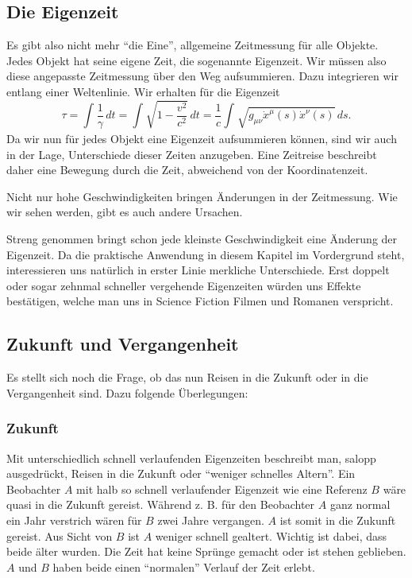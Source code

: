 \begin{refsection}
\subsection{Die Eigenzeit}
Es gibt also nicht mehr ``die Eine'', allgemeine Zeitmessung für alle Objekte. Jedes Objekt hat seine eigene Zeit, die sogenannte Eigenzeit. Wir müssen also diese angepasste Zeitmessung über den Weg aufsummieren.
Dazu integrieren wir entlang einer Weltenlinie. Wir erhalten für die Eigenzeit
\begin{equation}\label{Eigenzeit}
\tau
=
\int_{}^{}\frac{1}{\gamma}\,dt=\int_{}^{}\sqrt{1-\frac{v^2}{c^2}}\,dt
=
\frac{1}{c}\int_{}^{}\sqrt{g_{\mu\nu}\dot{x}^{\mu}(s)\dot{x}^{\nu}(s)}\,ds.
\end{equation}
Da wir nun für jedes Objekt eine Eigenzeit aufsummieren können, sind wir auch in der Lage, Unterschiede dieser Zeiten anzugeben.
Eine Zeitreise beschreibt daher eine Bewegung durch die Zeit, abweichend von der Koordinatenzeit.

Nicht nur hohe Geschwindigkeiten bringen Änderungen in der Zeitmessung. Wie wir sehen werden, gibt es auch andere Ursachen.

Streng genommen bringt schon jede kleinste Geschwindigkeit eine Änderung der Eigenzeit. Da die praktische Anwendung in diesem Kapitel im Vordergrund steht, interessieren uns natürlich in erster Linie merkliche Unterschiede. Erst doppelt oder sogar zehnmal schneller vergehende Eigenzeiten würden uns Effekte bestätigen, welche man uns in Science Fiction Filmen und Romanen verspricht.

\subsection{Zukunft und Vergangenheit}
%
%
Es stellt sich noch die Frage, ob das nun Reisen in die Zukunft oder in die Vergangenheit sind. Dazu folgende Überlegungen:

\subsubsection{Zukunft}
Mit unterschiedlich schnell verlaufenden Eigenzeiten beschreibt man, salopp ausgedrückt, Reisen in die Zukunft oder ``weniger schnelles Altern''. Ein Beobachter $A$ mit halb so schnell verlaufender Eigenzeit wie eine Referenz $B$ wäre quasi in die Zukunft gereist.
Während z. B. für den Beobachter $A$ ganz normal ein Jahr verstrich wären für $B$ zwei Jahre vergangen. $A$ ist somit in die Zukunft gereist. Aus Sicht von $B$ ist $A$ weniger schnell gealtert. Wichtig ist dabei, dass beide älter wurden. Die Zeit hat keine Sprünge gemacht oder ist stehen geblieben. $A$ und $B$ haben beide einen ``normalen'' Verlauf der Zeit erlebt.


\end{refsection}
